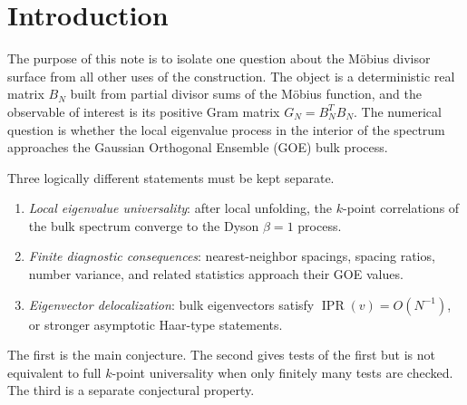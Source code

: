 \documentclass[11pt]{amsart}
\numberwithin{equation}{section}
\theoremstyle{plain}
\theoremstyle{definition}
\theoremstyle{remark}
\newcommand{\IPR}{\operatorname{IPR}}
\begin{document}
\begin{abstract}
Direct diagonalization gives, on the numerical central $25\%$--$75\%$ window,
\begin{equation}
\overline r=0.5391491230\quad(N=2000),
\qquad
\overline r=0.5376551534\quad(N=4000),
\label{eq:abstract_gap_ratios}
\end{equation}
and
\begin{equation}
N\,\overline{\IPR}=3.48631797\quad(N=2000),
\qquad
N\,\overline{\IPR}=3.51017535\quad(N=4000).
\label{eq:abstract_ipr}
\end{equation}
These are finite-$N$ observations.  The exact arithmetic results and the numerical GOE evidence are kept logically separate.
\end{abstract}

\maketitle
\tableofcontents
\bigskip

\section{Introduction}
\label{sec:introduction}

The purpose of this note is to isolate one question about the M\"obius divisor surface from all other uses of the construction.  The object is a deterministic real matrix $B_N$ built from partial divisor sums of the M\"obius function, and the observable of interest is its positive Gram matrix $G_N=B_N^TB_N$.  The numerical question is whether the local eigenvalue process in the interior of the spectrum approaches the Gaussian Orthogonal Ensemble (GOE) bulk process.

Three logically different statements must be kept separate.

\begin{enumerate}[label=(\roman*)]
\item \emph{Local eigenvalue universality}: after local unfolding, the $k$-point correlations of the bulk spectrum converge to the Dyson $\beta=1$ process.
\item \emph{Finite diagnostic consequences}: nearest-neighbor spacings, spacing ratios, number variance, and related statistics approach their GOE values.
\item \emph{Eigenvector delocalization}: bulk eigenvectors satisfy $\IPR(v)=O(N^{-1})$, or stronger asymptotic Haar-type statements.
\end{enumerate}

The first is the main conjecture.  The second gives tests of the first but is not equivalent to full $k$-point universality when only finitely many tests are checked.  The third is a separate conjectural property.
\end{document}
